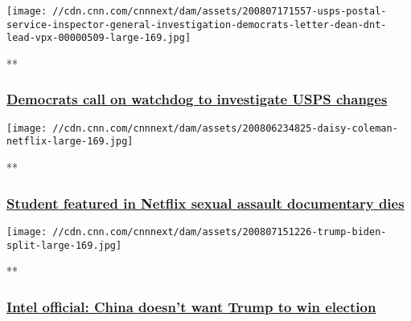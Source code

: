 \href{/videos/politics/2020/08/07/usps-postal-service-inspector-general-investigation-democrats-letter-dean-dnt-lead-vpx.cnn/video/playlists/top-news-videos/}{}

\texttt{[image: //cdn.cnn.com/cnnnext/dam/assets/200807171557-usps-postal-service-inspector-general-investigation-democrats-letter-dean-dnt-lead-vpx-00000509-large-169.jpg]}

**

\hypertarget{democrats-call-on-watchdog-to-investigate-usps-changes}{%
\subsubsection{\texorpdfstring{\href{/videos/politics/2020/08/07/usps-postal-service-inspector-general-investigation-democrats-letter-dean-dnt-lead-vpx.cnn/video/playlists/top-news-videos/}{Democrats
call on watchdog to investigate USPS
changes}}{Democrats call on watchdog to investigate USPS changes}}\label{democrats-call-on-watchdog-to-investigate-usps-changes}}

\href{/videos/us/2020/08/07/daisy-coleman-student-death-sexual-assault-netflix-eg-orig.cnn/video/playlists/top-news-videos/}{}

\texttt{[image: //cdn.cnn.com/cnnnext/dam/assets/200806234825-daisy-coleman-netflix-large-169.jpg]}

**

\hypertarget{student-featured-in-netflix-sexual-assault-documentary-dies}{%
\subsubsection{\texorpdfstring{\href{/videos/us/2020/08/07/daisy-coleman-student-death-sexual-assault-netflix-eg-orig.cnn/video/playlists/top-news-videos/}{Student
featured in Netflix sexual assault documentary
dies}}{Student featured in Netflix sexual assault documentary dies}}\label{student-featured-in-netflix-sexual-assault-documentary-dies}}

\href{/videos/politics/2020/08/07/2020-election-russia-china-iran-perez-sot-nr-vpx.cnn/video/playlists/top-news-videos/}{}

\texttt{[image: //cdn.cnn.com/cnnnext/dam/assets/200807151226-trump-biden-split-large-169.jpg]}

**

\hypertarget{intel-official-china-doesnt-want-trump-to-win-election}{%
\subsubsection{\texorpdfstring{\href{/videos/politics/2020/08/07/2020-election-russia-china-iran-perez-sot-nr-vpx.cnn/video/playlists/top-news-videos/}{Intel
official: China doesn't want Trump to win
election}}{Intel official: China doesn't want Trump to win election}}\label{intel-official-china-doesnt-want-trump-to-win-election}}

